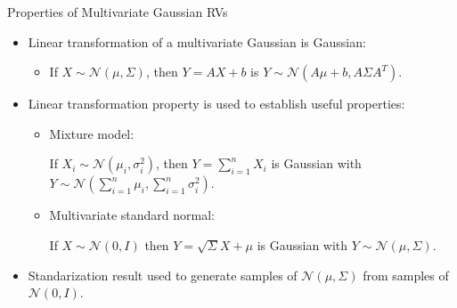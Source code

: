 \documentclass[9pt]{beamer}
\begin{document}
%
\begin{frame}{Properties of Multivariate Gaussian RVs}

\begin{itemize}
\item Linear transformation of a multivariate Gaussian is Gaussian: 
\begin{itemize}
\item If $X\sim\mathcal{N}(\mu,\Sigma)$, then $Y=AX+b$ is $Y\sim \mathcal{N}(A\mu+b,A\Sigma A^T)$. 
\end{itemize}
\vspace{0.1in}
\item Linear transformation property is used to establish useful properties:
\begin{itemize}
\item Mixture model:

 If $X_i\sim \mathcal{N}(\mu_i,\sigma_i^2)$, then $Y=\sum_{i=1}^nX_i$ is Gaussian with $Y\sim\mathcal{N}(\sum_{i=1}^n\mu_i,\sum_{i=1}^n\sigma_i^2)$. 
 \vspace{0.1in}
\item Multivariate standard normal: 

If $X\sim\mathcal{N}(0,{I})$ then $Y=\sqrt{\Sigma}X+\mu$ is Gaussian with $Y\sim\mathcal{N}(\mu,\Sigma)$.
\end{itemize}
\item Standarization result used to generate samples of $\mathcal{N}(\mu,\Sigma)$ from samples of $\mathcal{N}(0,I)$.
\end{itemize}

\end{frame}
\end{document}
